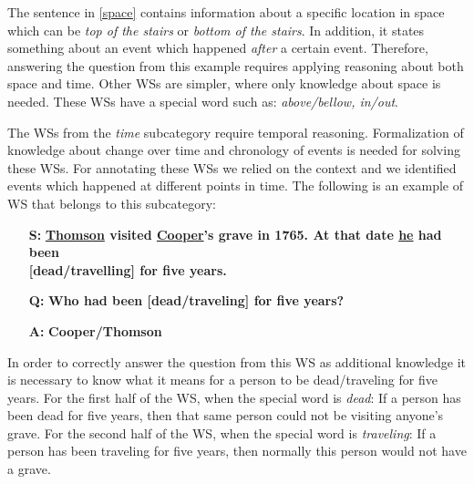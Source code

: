 The sentence in \ref{space} contains information about a specific location in space which can be \textit{top of the stairs} or \textit{bottom of the stairs}. In addition, it states something about an event which happened \textit{after} a certain event. Therefore, answering the question from this example requires applying reasoning about both space and time. Other WSs are simpler, where only knowledge about space is needed. These WSs have a special word such as: \textit{above/bellow, in/out}.

The WSs from the \textit{time} subcategory require temporal reasoning. 
Formalization of knowledge about change over time and chronology of events is needed for solving these WSs. For annotating these WSs we relied on the context and we identified events which happened at different points in time. The following is an example of WS that belongs to this subcategory:

\begin{itemize} \label{Ex2}
	\item[\textbf{S:}] \textbf{\underline{Thomson} visited \underline{Cooper}'s grave in 1765. At that date \underline{he} had been} \\ \textbf{[dead/travelling] for five years.}
	\item[\textbf{Q:}] \textbf{ Who had been [dead/traveling] for five years? }
	\item[\textbf{A:}] \textbf{Cooper/Thomson}
\end{itemize}
In order to correctly answer the question from this WS as additional knowledge it is necessary to know what it means for a person to be dead/traveling for five years. For the first half of the WS, when the special word is \textit{dead}: If a person has been dead for five years, then that same person could not be visiting anyone's grave. For the second half of the WS,  when the special word is \textit{traveling}: If a person has been traveling for five years, then normally this person would not have a grave. 

